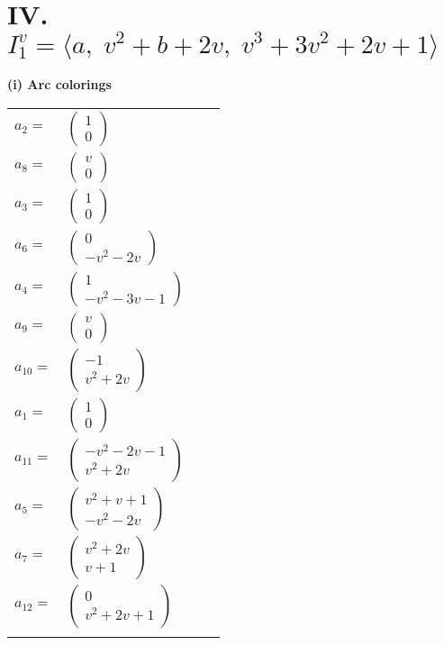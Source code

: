 \documentclass[1p]{elsarticle_modified}
\theoremstyle{definition}
\begin{document}
\centering \section*{IV. $I^v_{1}= \langle a,\;v^2+b+2 v,\;v^3+3 v^2+2 v+1 \rangle$}
\flushleft \textbf{(i) Arc colorings}\\
\begin{tabular}{m{7pt} m{180pt} m{7pt} m{180pt} }
\flushright $a_{2}=$&$\begin{pmatrix}1\\0\end{pmatrix}$ \\
\flushright $a_{8}=$&$\begin{pmatrix}v\\0\end{pmatrix}$ \\
\flushright $a_{3}=$&$\begin{pmatrix}1\\0\end{pmatrix}$ \\
\flushright $a_{6}=$&$\begin{pmatrix}0\\- v^2-2 v\end{pmatrix}$ \\
\flushright $a_{4}=$&$\begin{pmatrix}1\\- v^2-3 v-1\end{pmatrix}$ \\
\flushright $a_{9}=$&$\begin{pmatrix}v\\0\end{pmatrix}$ \\
\flushright $a_{10}=$&$\begin{pmatrix}-1\\v^2+2 v\end{pmatrix}$ \\
\flushright $a_{1}=$&$\begin{pmatrix}1\\0\end{pmatrix}$ \\
\flushright $a_{11}=$&$\begin{pmatrix}- v^2-2 v-1\\v^2+2 v\end{pmatrix}$ \\
\flushright $a_{5}=$&$\begin{pmatrix}v^2+v+1\\- v^2-2 v\end{pmatrix}$ \\
\flushright $a_{7}=$&$\begin{pmatrix}v^2+2 v\\v+1\end{pmatrix}$ \\
\flushright $a_{12}=$&$\begin{pmatrix}0\\v^2+2 v+1\end{pmatrix}$\\&\end{tabular}
\end{document}
